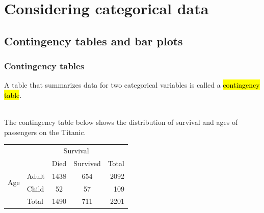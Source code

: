 \documentclass[slidestop,compress,mathserif]{beamer}
\begin{document}





\section{Considering categorical data}


\subsection{Contingency tables and bar plots}


\begin{frame}
\frametitle{Contingency tables}

A table that summarizes data for two categorical variables is called a \hl{contingency table}.

$\:$ \\
\pause
The contingency table below shows the distribution of survival and ages of passengers on the Titanic.

\begin{center}
\begin{tabular}{l l cc r}
					               & 			 & \multicolumn{2}{c}{{Survival}} \\
  \cline{3-4}
					               &			 & Died	 & Survived	& Total \\ 
  \cline{2-5}
\multirow{2}{*}{{Age}}& Adult & 1438  & 654 	  	& 2092 \\ 
  					             & Child & 52 	 & 57	 	    & 109\\ 
  \cline{2-5}
  					             & Total & 1490  & 711	    &  2201 \\
  \cline{2-5}
\end{tabular}
\end{center}
\end{frame}

\end{document}
